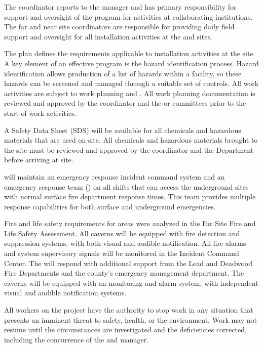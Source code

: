 The   coordinator reports to the
  manager and has primary responsibility
for  support and oversight of the  
program for activities at collaborating institutions.  The far and near site
 coordinators are responsible for providing daily field support and
oversight for all installation activities at the 
and  sites.

The   plan defines the 
requirements applicable to installation activities at the 
site. A key element of an effective  program is the hazard
identification process. Hazard identification allows production of a
list of hazards within a facility, so these hazards can be screened
and managed through a suitable set of controls. All work activities
are subject to work planning and .  
All work planning documentation is reviewed and
approved by the   coordinator and the 
 or  committees prior to the start of work activities.

A Safety Data Sheet (SDS) will be available for all chemicals and
hazardous materials that are used on-site. All chemicals and hazardous
materials brought to the  site must be reviewed and approved by the
  coordinator and the  
Department before arriving at site.

 will maintain an emergency response incident command
system and an emergency response team () on all shifts that can access the
underground sites with normal surface fire department response
times. This team provides multiple response capabilities for both
surface and underground emergencies.

Fire and life safety requirements for  areas were
analyzed in the  Far Site Fire and Life Safety
  Assessment. All caverns will be equipped with
fire detection and suppression systems, with both visual and audible
notification.  All fire alarms and system supervisory signals will be
monitored in the  Incident Command Center.  The
  will respond with additional support from the
Lead and Deadwood Fire Departments and the county's emergency management
department. The caverns will be equipped with
an  monitoring and alarm system, with independent visual and
audible notification systems.

All workers on the  project have the
authority to stop work in any situation that presents an imminent
threat to safety, health, or the environment. Work may not resume
until the circumstances are investigated and the deficiencies corrected,
including the concurrence of the  
and   manager.

